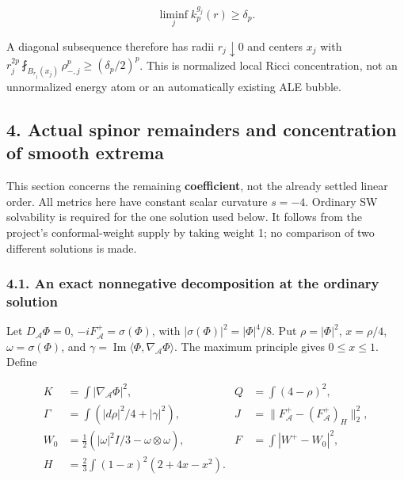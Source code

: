 \documentclass[
  10pt,
]{article}
\begin{document}
\[
                         \liminf_j k_p^{g_j}(r)\ge\delta_p.      \tag{3.14}
\]

A diagonal subsequence therefore has radii \(r_j\downarrow0\) and
centers \(x_j\) with
\(r_j^{2p}\fint_{B_{r_j}(x_j)}\rho_{-,j}^p \ge(\delta_p/2)^p\). This is
normalized local Ricci concentration, not an unnormalized energy atom or
an automatically existing ALE bubble.

\hypertarget{actual-spinor-remainders-and-concentration-of-smooth-extrema}{%
\subsection{4. Actual spinor remainders and concentration of smooth
extrema}\label{actual-spinor-remainders-and-concentration-of-smooth-extrema}}

This section concerns the remaining \textbf{coefficient}, not the
already settled linear order. All metrics here have constant scalar
curvature \(s=-4\). Ordinary SW solvability is required for the one
solution used below. It follows from the project's conformal-weight
supply by taking weight 1; no comparison of two different solutions is
made.

\hypertarget{an-exact-nonnegative-decomposition-at-the-ordinary-solution}{%
\subsubsection{4.1. An exact nonnegative decomposition at the ordinary
solution}\label{an-exact-nonnegative-decomposition-at-the-ordinary-solution}}

Let \(D_{\mathcal A}\Phi=0\), \(-iF_{\mathcal A}^+=\sigma(\Phi)\), with
\(|\sigma(\Phi)|^2=|\Phi|^4/8\). Put \(\rho=|\Phi|^2\), \(x=\rho/4\),
\(\omega=\sigma(\Phi)\), and
\(\gamma=\operatorname{Im}\langle\Phi,\nabla_{\mathcal A}\Phi\rangle\).
The maximum principle gives \(0\le x\le1\). Define

\[
 \begin{aligned}
 K&=\int|\nabla_{\mathcal A}\Phi|^2,&Q&=\int(4-\rho)^2,\\
 \Gamma&=\int(|d\rho|^2/4+|\gamma|^2),&
 J&=\|F_{\mathcal A}^+-(F_{\mathcal A}^+)_H\|_2^2,\\
 W_0&=\tfrac12(|\omega|^2I/3-\omega\otimes\omega),&
 F&=\int|W^+-W_0|^2,\\
 H&=\tfrac23\int(1-x)^2(2+4x-x^2).&&
 \end{aligned}                                                   \tag{4.1}
\]
\end{document}
